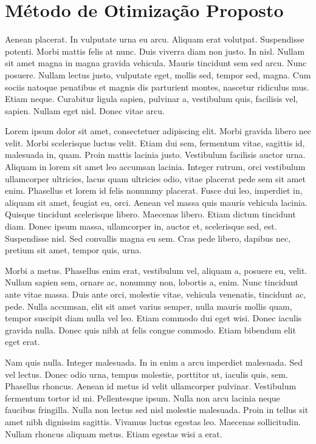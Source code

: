 \chapter{Método de Otimização Proposto}

Aenean placerat. In vulputate urna eu arcu. Aliquam erat volutpat. Suspendisse potenti. Morbi mattis felis at nunc. Duis viverra diam non justo. In nisl. Nullam sit amet magna in magna gravida vehicula. Mauris tincidunt sem sed arcu. Nunc posuere. Nullam lectus justo, vulputate eget, mollis sed, tempor sed, magna. Cum sociis natoque penatibus et magnis dis parturient montes, nascetur ridiculus mus. Etiam neque. Curabitur ligula sapien, pulvinar a, vestibulum quis, facilisis vel, sapien. Nullam eget nisl. Donec vitae arcu.

Lorem ipsum dolor sit amet, consectetuer adipiscing elit. Morbi gravida libero nec velit. Morbi scelerisque luctus velit. Etiam dui sem, fermentum vitae, sagittis id, malesuada in, quam. Proin mattis lacinia justo. Vestibulum facilisis auctor urna. Aliquam in lorem sit amet leo accumsan lacinia. Integer rutrum, orci vestibulum ullamcorper ultricies, lacus quam ultricies odio, vitae placerat pede sem sit amet enim. Phasellus et lorem id felis nonummy placerat. Fusce dui leo, imperdiet in, aliquam sit amet, feugiat eu, orci. Aenean vel massa quis mauris vehicula lacinia. Quisque tincidunt scelerisque libero. Maecenas libero. Etiam dictum tincidunt diam. Donec ipsum massa, ullamcorper in, auctor et, scelerisque sed, est. Suspendisse nisl. Sed convallis magna eu sem. Cras pede libero, dapibus nec, pretium sit amet, tempor quis, urna.

Morbi a metus. Phasellus enim erat, vestibulum vel, aliquam a, posuere eu, velit. Nullam sapien sem, ornare ac, nonummy non, lobortis a, enim. Nunc tincidunt ante vitae massa. Duis ante orci, molestie vitae, vehicula venenatis, tincidunt ac, pede. Nulla accumsan, elit sit amet varius semper, nulla mauris mollis quam, tempor suscipit diam nulla vel leo. Etiam commodo dui eget wisi. Donec iaculis gravida nulla. Donec quis nibh at felis congue commodo. Etiam bibendum elit eget erat.

Nam quis nulla. Integer malesuada. In in enim a arcu imperdiet malesuada. Sed vel lectus. Donec odio urna, tempus molestie, porttitor ut, iaculis quis, sem. Phasellus rhoncus. Aenean id metus id velit ullamcorper pulvinar. Vestibulum fermentum tortor id mi. Pellentesque ipsum. Nulla non arcu lacinia neque faucibus fringilla. Nulla non lectus sed nisl molestie malesuada. Proin in tellus sit amet nibh dignissim sagittis. Vivamus luctus egestas leo. Maecenas sollicitudin. Nullam rhoncus aliquam metus. Etiam egestas wisi a erat.

